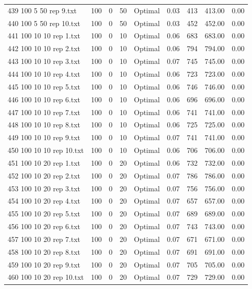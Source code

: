 \begin{longtable}{lrrllrrrr}
439 100 5 50 rep 9.txt & 100 & 0 & 50 & Optimal &  0.03 & 413 & 413.00 &  0.00\\
440 100 5 50 rep 10.txt & 100 & 0 & 50 & Optimal &  0.03 & 452 & 452.00 &  0.00\\
441 100 10 10 rep 1.txt & 100 & 0 & 10 & Optimal &  0.06 & 683 & 683.00 &  0.00\\
442 100 10 10 rep 2.txt & 100 & 0 & 10 & Optimal &  0.06 & 794 & 794.00 &  0.00\\
443 100 10 10 rep 3.txt & 100 & 0 & 10 & Optimal &  0.07 & 745 & 745.00 &  0.00\\
444 100 10 10 rep 4.txt & 100 & 0 & 10 & Optimal &  0.06 & 723 & 723.00 &  0.00\\
445 100 10 10 rep 5.txt & 100 & 0 & 10 & Optimal &  0.06 & 746 & 746.00 &  0.00\\
446 100 10 10 rep 6.txt & 100 & 0 & 10 & Optimal &  0.06 & 696 & 696.00 &  0.00\\
447 100 10 10 rep 7.txt & 100 & 0 & 10 & Optimal &  0.06 & 741 & 741.00 &  0.00\\
448 100 10 10 rep 8.txt & 100 & 0 & 10 & Optimal &  0.06 & 725 & 725.00 &  0.00\\
449 100 10 10 rep 9.txt & 100 & 0 & 10 & Optimal &  0.07 & 741 & 741.00 &  0.00\\
450 100 10 10 rep 10.txt & 100 & 0 & 10 & Optimal &  0.06 & 706 & 706.00 &  0.00\\
451 100 10 20 rep 1.txt & 100 & 0 & 20 & Optimal &  0.06 & 732 & 732.00 &  0.00\\
452 100 10 20 rep 2.txt & 100 & 0 & 20 & Optimal &  0.07 & 786 & 786.00 &  0.00\\
453 100 10 20 rep 3.txt & 100 & 0 & 20 & Optimal &  0.07 & 756 & 756.00 &  0.00\\
454 100 10 20 rep 4.txt & 100 & 0 & 20 & Optimal &  0.07 & 657 & 657.00 &  0.00\\
455 100 10 20 rep 5.txt & 100 & 0 & 20 & Optimal &  0.07 & 689 & 689.00 &  0.00\\
456 100 10 20 rep 6.txt & 100 & 0 & 20 & Optimal &  0.07 & 743 & 743.00 &  0.00\\
457 100 10 20 rep 7.txt & 100 & 0 & 20 & Optimal &  0.07 & 671 & 671.00 &  0.00\\
458 100 10 20 rep 8.txt & 100 & 0 & 20 & Optimal &  0.07 & 691 & 691.00 &  0.00\\
459 100 10 20 rep 9.txt & 100 & 0 & 20 & Optimal &  0.07 & 705 & 705.00 &  0.00\\
460 100 10 20 rep 10.txt & 100 & 0 & 20 & Optimal &  0.07 & 729 & 729.00 &  0.00\\

\end{longtable}
